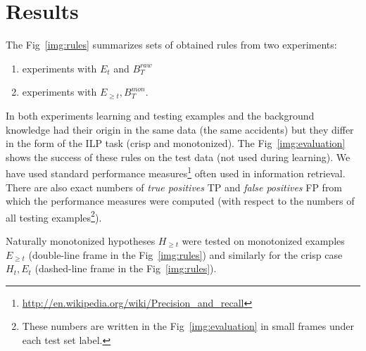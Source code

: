 \documentclass[authoryear,12pt]{elsarticle}
\begin{document}
%


\section{Results} \label{sec:results}

The Fig~\ref{img:rules} summarizes sets of obtained rules from two experiments: 
\begin{enumerate}
	\item experiments with $E_t$ and $B^{raw}_{T}$ 
	\item experiments with $E_{\ge t}, {B}^{mon}_T$.
\end{enumerate}
In both experiments learning and testing examples and the background knowledge had their origin in the same data (the same accidents) but they differ in the form of the ILP task (crisp and monotonized). The Fig~\ref{img:evaluation} shows the success of these rules on the test data (not used during learning). We have used standard performance measures\footnote{\url{http://en.wikipedia.org/wiki/Precision_and_recall}} often used in information retrieval. There are also exact numbers of \emph{true positives} TP and \emph{false positives} FP from which the performance measures were computed (with respect to the numbers of all testing examples\footnote{These numbers are written in the Fig~\ref{img:evaluation} in small frames under each test set label.}).

Naturally monotonized hypotheses $H_{\ge t}$ were tested on monotonized examples $E_{\ge t}$ (double-line frame in the Fig~\ref{img:rules}) and similarly for the crisp case $H_t, E_t$ (dashed-line frame in the Fig~\ref{img:rules}).
\end{document}
